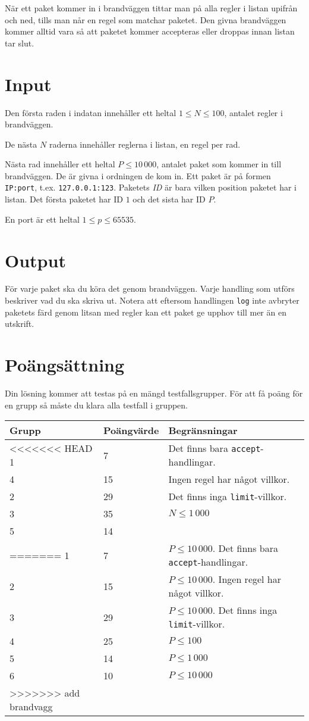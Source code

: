 När ett paket kommer in i brandväggen tittar man på alla regler i listan upifrån och ned, tills man når en regel som matchar paketet. Den givna brandväggen kommer alltid vara
så att paketet kommer accepteras eller droppas innan listan tar slut.

\section*{Input}
Den första raden i indatan innehåller ett heltal $1 \le N \le 100$, antalet regler i brandväggen.

De nästa $N$ raderna innehåller reglerna i listan, en regel per rad.

Nästa rad innehåller ett heltal $P \le 10\,000$, antalet paket som kommer in till brandväggen. De är givna i ordningen de kom in.
Ett paket är på formen \texttt{IP:port}, t.ex. \texttt{127.0.0.1:123}. Paketets \emph{ID} är bara vilken position paketet har i listan. Det första paketet har ID $1$ och det sista har ID $P$.

En port är ett heltal $1 \le p \le 65535$.

\section*{Output}
För varje paket ska du köra det genom brandväggen. Varje handling som utförs beskriver vad du ska skriva ut. Notera att eftersom handlingen \texttt{log} inte avbryter
paketets färd genom litsan med regler kan ett paket ge upphov till mer än en utskrift.

\section*{Poängsättning}
Din lösning kommer att testas på en mängd testfallsgrupper. För att få poäng för en grupp så måste du klara alla testfall i gruppen.

\begin{tabular}{| l | l | l |}
	\hline
	Grupp & Poängvärde & Begränsningar\\ \hline
<<<<<<< HEAD
	1     & 7          & Det finns bara \texttt{accept}-handlingar.  \\ \hline
	4     & 15         & Ingen regel har något villkor. \\ \hline
	2     & 29         & Det finns inga \texttt{limit}-villkor. \\ \hline
	3     & 35         & $N \le 1\,000$ \\ \hline
	5     & 14         &  \\ \hline
=======
	1     & 7          & $P \le 10\,000$. Det finns bara \texttt{accept}-handlingar.  \\ \hline
	2     & 15         & $P \le 10\,000$. Ingen regel har något villkor. \\ \hline
	3     & 29         & $P \le 10\,000$. Det finns inga \texttt{limit}-villkor. \\ \hline
	4     & 25         & $P \le 100$ \\ \hline
	5     & 14         & $P \le 1\,000$ \\ \hline
	6     & 10         & $P \le 10\,000$ \\ \hline
>>>>>>> add brandvagg
\end{tabular}
